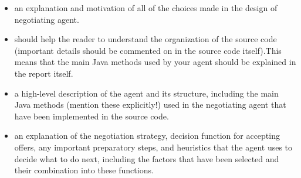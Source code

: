 \begin{itemize}
\item an explanation and motivation of all of the choices made in the design of negotiating agent.
\item should help the reader to understand the organization of the source code (important details should be commented on in the source code itself).This means that the main Java methods used by your agent should
be explained in the report itself.
\item a high-level description of the agent and its structure, including the main Java methods (mention these explicitly!) used in the negotiating agent that have been implemented in the source code.
\item an explanation of the negotiation strategy, decision function for accepting offers, any important preparatory steps, and heuristics that the agent uses to decide what to do next, including the factors that have been selected and their combination into these functions.
\end{itemize}